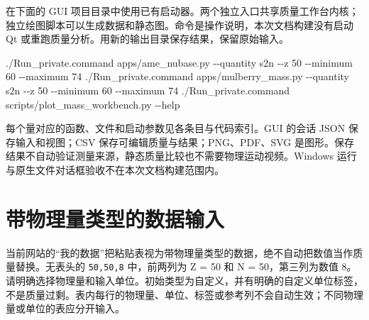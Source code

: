 \documentclass[
  11pt,
  letterpaper,
]{article}
\newenvironment{Shaded}{}{}
\newcommand{\AttributeTok}[1]{\textcolor[rgb]{0.49,0.56,0.16}{#1}}
\newcommand{\ExtensionTok}[1]{#1}
\newcommand{\NormalTok}[1]{#1}
\begin{document}
在下面的 GUI
项目目录中使用已有启动器。两个独立入口共享质量工作台内核；独立绘图脚本可以生成数据和静态图。命令是操作说明，本次文档构建没有启动
Qt 或重跑质量分析。用新的输出目录保存结果，保留原始输入。

\begin{Shaded}
\begin{Highlighting}[]

\ExtensionTok{./Run\_private.command}\NormalTok{ apps/ame\_nubase.py }\AttributeTok{{-}{-}quantity}\NormalTok{ s2n }\AttributeTok{{-}{-}z}\NormalTok{ 50 }\AttributeTok{{-}{-}minimum}\NormalTok{ 60 }\AttributeTok{{-}{-}maximum}\NormalTok{ 74}
\ExtensionTok{./Run\_private.command}\NormalTok{ apps/mulberry\_mass.py }\AttributeTok{{-}{-}quantity}\NormalTok{ s2n }\AttributeTok{{-}{-}z}\NormalTok{ 50 }\AttributeTok{{-}{-}minimum}\NormalTok{ 60 }\AttributeTok{{-}{-}maximum}\NormalTok{ 74}
\ExtensionTok{./Run\_private.command}\NormalTok{ scripts/plot\_mass\_workbench.py }\AttributeTok{{-}{-}help}
\end{Highlighting}
\end{Shaded}

每个量对应的函数、文件和启动参数见各条目与代码索引。GUI 的会话 JSON
保存输入和视图；CSV 保存可编辑质量与结果；PNG、PDF、SVG
是图形。保存结果不自动验证测量来源，静态质量比较也不需要物理运动视频。Windows
运行与原生文件对话框验收不在本次文档构建范围内。

\section{带物理量类型的数据输入}\label{ux5e26ux7269ux7406ux91cfux7c7bux578bux7684ux6570ux636eux8f93ux5165}

当前网站的``我的数据''把粘贴表视为带物理量类型的数据，绝不自动把数值当作质量替换。无表头的
\texttt{50,50,8} 中，前两列为 Z = 50 和 N = 50，第三列为数值
8。请明确选择物理量和输入单位。初始类型为自定义，并有明确的自定义单位标签，不是质量过剩。表内每行的物理量、单位、标签或参考列不会自动生效；不同物理量或单位的表应分开输入。
\end{document}
